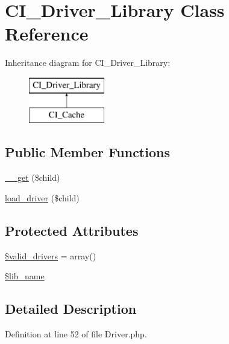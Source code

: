 \hypertarget{class_c_i___driver___library}{}\section{C\+I\+\_\+\+Driver\+\_\+\+Library Class Reference}
\label{class_c_i___driver___library}
Inheritance diagram for C\+I\+\_\+\+Driver\+\_\+\+Library\+:\begin{figure}[H]
\begin{center}
\leavevmode
\includegraphics[height=2.000000cm]{class_c_i___driver___library}
\end{center}
\end{figure}
\subsection*{Public Member Functions}
\begin{DoxyCompactItemize}
\item 
\mbox{\hyperlink{class_c_i___driver___library_a2fac4d4694e05e7eeba5282bd6ff8caf}{\+\_\+\+\_\+get}} (\$child)
\item 
\mbox{\hyperlink{class_c_i___driver___library_a7cc2908487e106164664ef7d743690b8}{load\+\_\+driver}} (\$child)
\end{DoxyCompactItemize}
\subsection*{Protected Attributes}
\begin{DoxyCompactItemize}
\item 
\mbox{\hyperlink{class_c_i___driver___library_a32d963b3d49fd67f188c1a74d38be6df}{\$valid\+\_\+drivers}} = array()
\item 
\mbox{\hyperlink{class_c_i___driver___library_ab820c27413d5904686c58f6b2941b603}{\$lib\+\_\+name}}
\end{DoxyCompactItemize}


\subsection{Detailed Description}


Definition at line 52 of file Driver.\+php.



